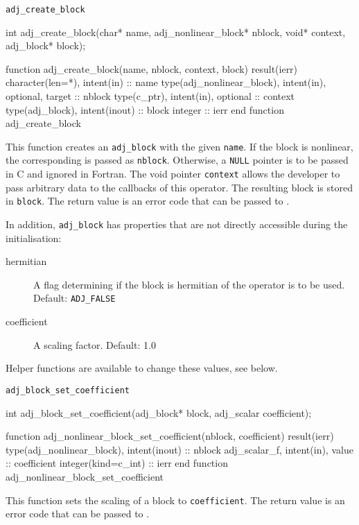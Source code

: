 
\begin{boxwithtitle}{\texttt{adj_create_block}}
\begin{minipage}{\columnwidth}
\begin{ccode}
  int adj_create_block(char* name, adj_nonlinear_block* nblock, void* context, 
                       adj_block* block);
\end{ccode}
\begin{fortrancode}
  function adj_create_block(name, nblock, context, block) result(ierr)
    character(len=*), intent(in) :: name
    type(adj_nonlinear_block), intent(in), optional, target :: nblock
    type(c_ptr), intent(in), optional :: context
    type(adj_block), intent(inout) :: block
    integer :: ierr
  end function adj_create_block
\end{fortrancode}
\end{minipage}
\end{boxwithtitle}
This function creates an \texttt{adj_block} with the given \texttt{name}.
If the block is nonlinear, the corresponding  is passed as \texttt{nblock}. 
Otherwise, a \texttt{NULL} pointer is to be passed in C and ignored in Fortran.
The void pointer \texttt{context} allows the developer to pass arbitrary data to the callbacks of this operator. 
The resulting block is stored in \texttt{block}. 
The return value is an error code that can be passed to .

In addition, \texttt{adj_block} has properties that are not directly accessible during the initialisation:
\begin{description}
  \item[hermitian] A flag determining if the block is hermitian of the operator is to be used. Default: \texttt{ADJ_FALSE}
  \item[coefficient] A scaling factor. Default: 1.0
\end{description}
Helper functions are available to change these values, see below. 


\begin{boxwithtitle}{\texttt{adj_block_set_coefficient}}
\begin{minipage}{\columnwidth}
\begin{ccode}
  int adj_block_set_coefficient(adj_block* block, adj_scalar coefficient);
\end{ccode}
\begin{fortrancode}
  function adj_nonlinear_block_set_coefficient(nblock, coefficient) result(ierr)
    type(adj_nonlinear_block), intent(inout) :: nblock
    adj_scalar_f, intent(in), value :: coefficient
    integer(kind=c_int) :: ierr
  end function adj_nonlinear_block_set_coefficient
\end{fortrancode}
\end{minipage}
\end{boxwithtitle}
This function sets the scaling of a block to \texttt{coefficient}. 
The return value is an error code that can be passed to .


